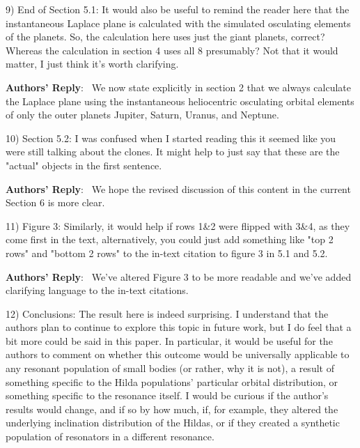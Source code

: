 \documentclass[11pt]{article}
\newenvironment{reply}
   {\medskip \noindent \begin{sf}\textbf{Authors' Reply}:\  }
   {\medskip \end{sf}\medskip}
\begin{document}
9) End of Section 5.1: It would also be useful to remind the reader here that the instantaneous Laplace plane is calculated with the simulated osculating elements of the planets. So, the calculation here uses just the giant planets, correct? Whereas the calculation in section 4 uses all 8 presumably? Not that it would matter, I just think it's worth clarifying.

\begin{reply}
We now state explicitly in section 2 that we always calculate the Laplace plane using the instantaneous heliocentric osculating orbital elements of only the outer planets Jupiter, Saturn, Uranus, and Neptune.
\end{reply}

10) Section 5.2: I was confused when I started reading this it seemed like you were still talking about the clones. It might help to just say that these are the "actual" objects in the first sentence.

\begin{reply}
We hope the revised discussion of this content in the current Section 6 is more clear.
\end{reply}

11) Figure 3: Similarly, it would help if rows 1\&2 were flipped with 3\&4, as they come first in the text, alternatively, you could just add something like "top 2 rows" and "bottom 2 rows" to the in-text citation to figure 3 in 5.1 and 5.2.

\begin{reply}
We've altered Figure 3 to be more readable and we've added clarifying language to the in-text citations.
\end{reply}

12) Conclusions: The result here is indeed surprising. I understand that the authors plan to continue to explore this topic in future work, but I do feel that a bit more could be said in this paper. In particular, it would be useful for the authors to comment on whether this outcome would be universally applicable to any resonant population of small bodies (or rather, why it is not), a result of something specific to the Hilda populations' particular orbital distribution, or something specific to the resonance itself. I would be curious if the author's results would change, and if so by how much, if, for example, they altered the underlying inclination distribution of the Hildas, or if they created a synthetic population of resonators in a different resonance.
\end{document}
